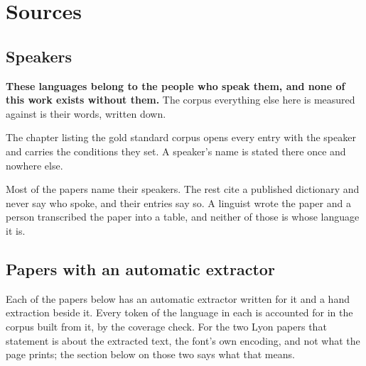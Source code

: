 \chapter{Sources}

\section{Speakers}

\textbf{These languages belong to the people who speak them, and none of this work exists without them.} The corpus everything else here is measured against is their words, written down.

The chapter listing the gold standard corpus opens every entry with the speaker and carries the conditions they set. A speaker's name is stated there once and nowhere else.

Most of the papers name their speakers. The rest cite a published dictionary and never say who spoke, and their entries say so. A linguist wrote the paper and a person transcribed the paper into a table, and neither of those is whose language it is.

\section{Papers with an automatic extractor}

Each of the papers below has an automatic extractor written for it and a hand extraction beside it. Every token of the language in each is accounted for in the corpus built from it, by the coverage check. For the two Lyon papers that statement is about the extracted text, the font's own encoding, and not what the page prints; the section below on those two says what that means.

